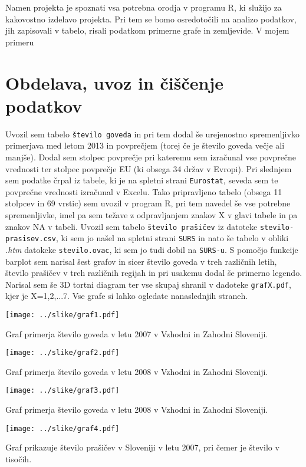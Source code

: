 \documentclass[11pt,a4paper]{article}
\begin{document}
Namen projekta je spoznati vsa potrebna orodja v programu R, ki služijo za kakovostno izdelavo projekta. Pri tem se bomo osredotočili na analizo podatkov, jih zapisovali v tabelo, risali podatkom primerne grafe in zemljevide. V mojem primeru

\section{Obdelava, uvoz in čiščenje podatkov}
Uvozil sem tabelo \verb|število goveda| in pri tem dodal še urejenostno spremenljivko primerjava med letom 2013 in povprečjem (torej če je število goveda večje ali manjše). Dodal sem stolpec povprečje pri kateremu sem izračunal vse povprečne vrednosti ter stolpec povprečje EU (ki obsega 34 držav v Evropi). Pri slednjem sem podatke črpal iz tabele, ki je na spletni strani \verb|Eurostat|, seveda sem te povprečne vrednosti izračunal v Excelu. Tako pripravljeno tabelo (obsega 11 stolpcev in 69 vrstic) sem uvozil v program R, pri tem navedel še vse potrebne spremenljivke, imel pa sem težave z odpravljanjem znakov X v glavi tabele in pa znakov NA v tabeli.
Uvozil sem tabelo \verb|število prašičev| iz datoteke \verb|stevilo-prasisev.csv|, ki sem jo našel na spletni strani \verb|SURS| in nato še tabelo v obliki \textit{.htm} datokeke \verb|stevilo.ovac|, ki sem jo tudi dobil na \verb|SURS-u|.
S pomočjo funkcije barplot sem narisal šest grafov in sicer število goveda v treh različnih letih, število prašičev v treh različnih regijah in pri usakemu dodal še primerno legendo. Narisal sem še 3D tortni diagram ter vse skupaj shranil v dadoteke \verb|grafX.pdf|, kjer je X={1,2,...7}. Vse grafe si lahko ogledate nanaslednjih straneh.


\texttt{[image: ../slike/graf1.pdf]}

Graf primerja število goveda v letu 2007 v Vzhodni in Zahodni Sloveniji.


\texttt{[image: ../slike/graf2.pdf]}

Graf primerja število goveda v letu 2008 v Vzhodni in Zahodni Sloveniji.

\texttt{[image: ../slike/graf3.pdf]}

Graf primerja število goveda v letu 2008 v Vzhodni in Zahodni Sloveniji.

\texttt{[image: ../slike/graf4.pdf]}

Graf prikazuje število prašičev v Sloveniji v letu 2007, pri čemer je število v tisočih.
\end{document}
